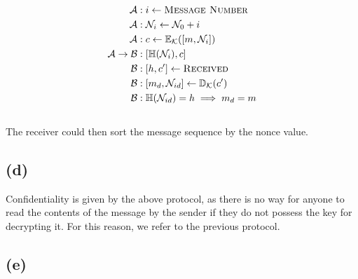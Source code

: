 \documentclass{article}
\begin{document}
\begin{align*}
    \mathcal A &: i \leftarrow \textsc{Message Number}
    \\
    \mathcal A &: \mathcal N_i \leftarrow \mathcal N_0 + i
    \\
    \mathcal A &: c \leftarrow \mathbb E_\mathcal{K} ([m, \mathcal N_i]) 
    \\
    \mathcal A \rightarrow \mathcal B &: [\mathbb H(\mathcal N_i), c] 
    \\
   \mathcal B &: [h, c'] \leftarrow \textsc{Received} 
   \\
   \mathcal B &: [m_d, \mathcal N_{id}] \leftarrow \mathbb D_{\mathcal K} (c') 
   \\
   \mathcal B &: \mathbb H(\mathcal N_{id}) = h \implies m_d = m
\end{align*}
\\
The receiver could then sort the message sequence by the nonce value.

\subsection*{(d)}

Confidentiality is given by the above protocol, as there is no way for anyone to read the contents of the message by the sender if they do not possess the key for decrypting it.
For this reason, we refer to the previous protocol.

\subsection*{(e)}
\end{document}
